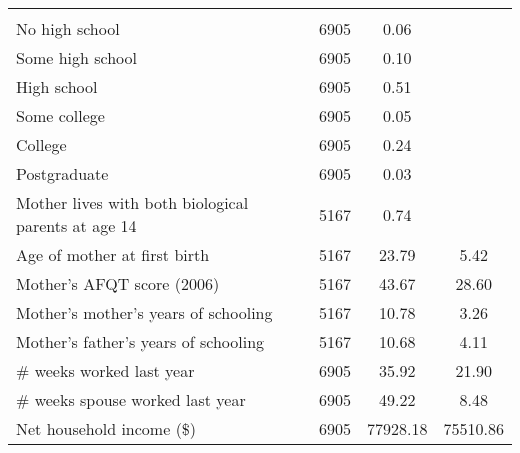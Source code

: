\begin{tabular}{l c S[table-format = 5.2] S[table-format= 5.2] }
\addlinespace {} \\
\hspace{0.4em}No high school & 6905   &  0.06   &  \\
\hspace{0.4em}Some high school &  6905   &   0.10   & \\
\hspace{0.4em}High school & 6905   &  0.51   &  \\
\hspace{0.4em}Some college & 6905   &  0.05   &  \\
\hspace{0.4em}College &  6905   &   0.24   & \\
\hspace{0.4em}Postgraduate &  6905   &   0.03   & \\
\hspace{0.4em}Mother lives with both biological parents at age 14& 5167  &     0.74&       \\
\hspace{0.4em}Age of mother at first birth& 5167  &    23.79&      5.42  \\
\hspace{0.4em}Mother's AFQT score (2006)&  5167   &  43.67&     28.60  \\
\hspace{0.4em}Mother's mother's years of schooling& 5167   &   10.78&      3.26  \\
\hspace{0.4em}Mother's father's years of schooling& 5167   &   10.68&      4.11  \\
\hspace{0.4em}$\#$ weeks worked last year&  6905  &   35.92&     21.90  \\
\hspace{0.4em}$\#$ weeks spouse worked last year& 6905   &   49.22&      8.48 \\
\hspace{0.4em}Net household income (\$)& 6905 &  77928.18&  75510.86  \\
\bottomrule
\end{tabular}

